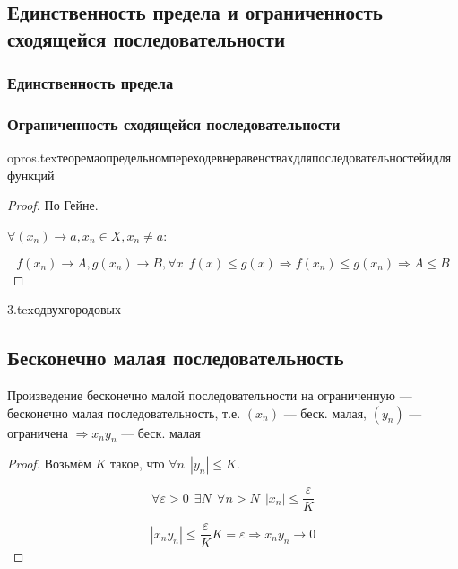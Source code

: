 \subsection{Единственность предела и ограниченность сходящейся последовательности}
\subsubsection{Единственность предела}
\subsubsection{Ограниченность сходящейся последовательности}

{opros.tex}{теоремаопредельномпереходевнеравенствахдляпоследовательностейидляфункций}
\begin{proof}
    По Гейне.

    $\forall (x_n)\to a, x_n\in X, x_n\not=a$:

    $$f(x_n)\to A, g(x_n)\to B, \forall x \ \ f(x) \leq g(x) \Rightarrow f(x_n)\leq g(x_n) \Rightarrow A\leq B$$
\end{proof}

{3.tex}{одвухгородовых}

\subsection{Бесконечно малая последовательность}
Произведение бесконечно малой последовательности на ограниченную --- бесконечно малая последовательность, т.е. $(x_n)$ --- беск. малая, $(y_n)$ --- ограничена $\Rightarrow x_ny_n$ --- беск. малая
\begin{proof}
    Возьмём $K$ такое, что $\forall n \ \ |y_n|\leq K$.

    $$\forall \varepsilon > 0 \ \ \exists N \ \ \forall n > N \ \ |x_n|\leq\frac{\varepsilon}{K}$$

    $$|x_ny_n|\leq\frac{\varepsilon}{K}K=\varepsilon \Rightarrow x_ny_n\to0$$
\end{proof}

